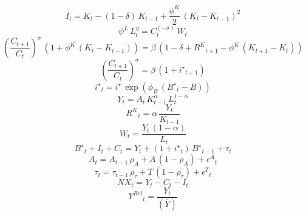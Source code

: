 \noindent[name= `Ley acumu. del capital']
\begin{dmath}
{I}_{t}={K}_{t}-\left(1-{\delta}\right)\, {K}_{t-1}+\frac{{\phi^{K}}}{2}\, \left({K}_{t}-{K}_{t-1}\right)^{2}
\end{dmath}
\noindent[name= `Oferta de trabajo']
\begin{dmath}
{\psi^L}\, {L}_{t}^{{\eta}}={C}_{t}^{\left(-{\sigma}\right)}\, {W}_{t}
\end{dmath}
\noindent[name= `Ecuación de Euler']
\begin{dmath}
\left(\frac{{C}_{t+1}}{{C}_{t}}\right)^{{\sigma}}\, \left(1+{\phi^{K}}\, \left({K}_{t}-{K}_{t-1}\right)\right)={\beta}\, \left(1-{\delta}+{R^{K}}_{t+1}-{\phi^{K}}\, \left({K}_{t+1}-{K}_{t}\right)\right)
\end{dmath}
\noindent[name= `Demanda de bonos']
\begin{dmath}
\left(\frac{{C}_{t+1}}{{C}_{t}}\right)^{{\sigma}}={\beta}\, \left(1+{i^{\star}}_{t+1}\right)
\end{dmath}
\noindent[name= `Tasa de interés deuda']
\begin{dmath}
{i^{\star}}_{t}={i^{\star}}\, \exp\left({\phi_{B}}\, \left({B^{\star}}_{t}-{B}\right)\right)
\end{dmath}
\noindent[name= `Función de producción']
\begin{dmath}
{Y}_{t}={A}_{t}\, {K}_{t-1}^{{\alpha}}\, {L}_{t}^{1-{\alpha}}
\end{dmath}
\noindent[name= `Demanda de capital']
\begin{dmath}
{R^{K}}_{t}={\alpha}\, \frac{{Y}_{t}}{{K}_{t-1}}
\end{dmath}
\noindent[name= `Demanda de trabajo']
\begin{dmath}
{W}_{t}=\frac{{Y}_{t}\, \left(1-{\alpha}\right)}{{L}_{t}}
\end{dmath}
\noindent[name= `Demanda agregada']
\begin{dmath}
{B^{\star}}_{t}+{I}_{t}+{C}_{t}={Y}_{t}+\left(1+{i^{\star}}_{t}\right)\, {B^{\star}}_{t-1}+{\tau}_{t}
\end{dmath}
\noindent[name= `Productividad']
\begin{dmath}
{A}_{t}={A}_{t-1}\, {\rho_{A}}+{A}\, \left(1-{\rho_{A}}\right)+{\epsilon^{A}}_{t}
\end{dmath}
\noindent[name= `Transferencias']
\begin{dmath}
{\tau}_{t}={\tau}_{t-1}\, {\rho_{\tau}}+{T}\, \left(1-{\rho_{\tau}}\right)+{\epsilon^{T}}_{t}
\end{dmath}
\noindent[name= `Exportaciones netas']
\begin{dmath}
{NX}_{t}={Y}_{t}-{C}_{t}-{I}_{t}
\end{dmath}
\noindent[name= `Producción relativa al SS']
\begin{dmath}
{Y^{Rel}}_{t}=\frac{{Y}_{t}}{(\bar{Y})}
\end{dmath}
